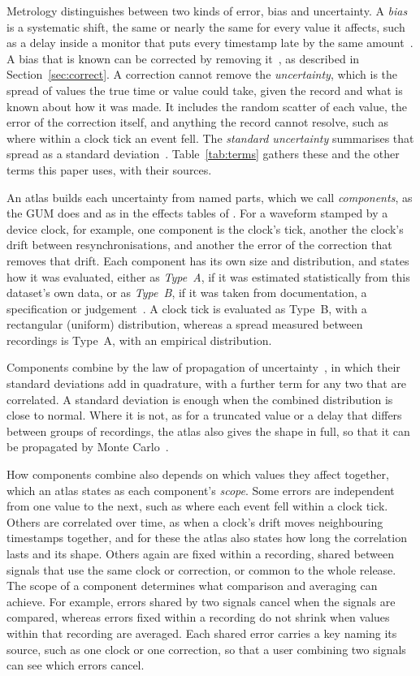 \documentclass[11pt,a4paper]{article}
\begin{document}
Metrology distinguishes between two kinds of error, bias and uncertainty. A \emph{bias} is a systematic shift, the
same or nearly the same for every value it affects, such as a delay inside a monitor that puts every timestamp late by
the same amount~\citep{jcgm-200-2012}. A bias that is known can be corrected by removing it~\citep{jcgm-100-2008}, as
described in Section~\ref{sec:correct}. A correction cannot remove the \emph{uncertainty}, which is the spread of
values the true time or value could take, given the record and what is known about how it was made. It includes the
random scatter of each value, the error of the correction itself, and anything the record cannot resolve, such as
where within a clock tick an event fell. The \emph{standard uncertainty} summarises that spread as a standard
deviation~\citep{jcgm-100-2008}. Table~\ref{tab:terms} gathers these and the other terms this paper uses, with their
sources.

An atlas builds each uncertainty from named parts, which we call \emph{components}, as the GUM does and as in the
effects tables of \citet{mittaz2019metrology}. For a waveform stamped by a device clock, for example, one component is
the clock's tick, another the clock's drift between resynchronisations, and another the error of the correction that
removes that drift. Each component has its own size and distribution, and states how it was evaluated, either as
\emph{Type~A}, if it was estimated statistically from this dataset's own data, or as \emph{Type~B}, if it was taken
from documentation, a specification or judgement~\citep{jcgm-100-2008}. A clock tick is evaluated as Type~B, with a
rectangular (uniform) distribution, whereas a spread measured between recordings is Type~A, with an empirical
distribution.

Components combine by the law of propagation of uncertainty~\citep{jcgm-100-2008}, in which their standard deviations
add in quadrature, with a further term for any two that are correlated. A standard deviation is enough when the
combined distribution is close to normal. Where it is not, as for a truncated value or a delay that differs between
groups of recordings, the atlas also gives the shape in full, so that it can be propagated by Monte
Carlo~\citep{jcgm-101-2008}.

How components combine also depends on which values they affect together, which an atlas states as each component's
\emph{scope}. Some errors are independent from one value to the next, such as where each event fell within a clock
tick. Others are correlated over time, as when a clock's drift moves neighbouring timestamps together, and for these
the atlas also states how long the correlation lasts and its shape. Others again are fixed within a recording, shared
between signals that use the same clock or correction, or common to the whole release. The scope of a component
determines what comparison and averaging can achieve. For example, errors shared by two signals cancel when the
signals are compared, whereas errors fixed within a recording do not shrink when values within that recording are
averaged. Each shared error carries a key naming its source, such as one clock or one correction, so that a user
combining two signals can see which errors cancel.
\end{document}
